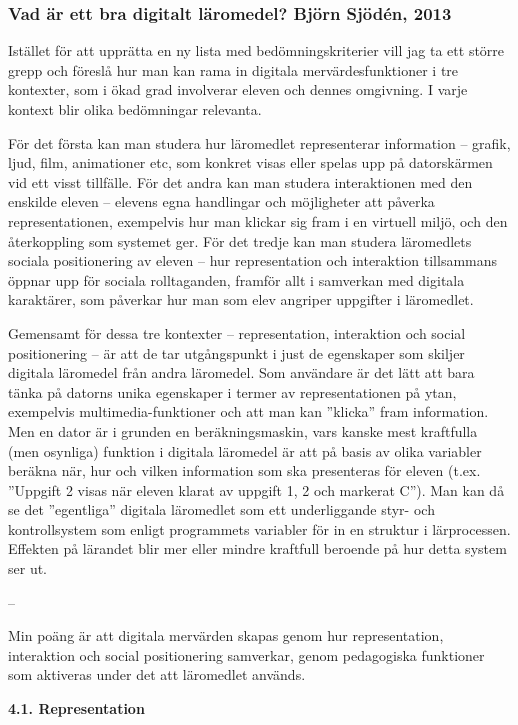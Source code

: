 \subsubsection{Vad är ett bra digitalt läromedel? Björn Sjödén, 2013}

Istället för att upprätta en ny lista med bedömningskriterier vill jag ta ett större grepp och föreslå hur man kan rama in digitala mervärdesfunktioner i tre kontexter, som i ökad grad involverar eleven och dennes omgivning. I varje kontext blir olika bedömningar relevanta.

För det första kan man studera hur läromedlet representerar information – grafik, ljud, film, animationer etc, som konkret visas eller spelas upp på datorskärmen vid ett visst tillfälle. För det andra kan man studera interaktionen med den enskilde eleven – elevens egna handlingar och möjligheter att påverka representationen, exempelvis hur man klickar sig fram i en virtuell miljö, och den återkoppling som systemet ger. För det tredje kan man studera läromedlets sociala positionering av eleven – hur representation och interaktion tillsammans öppnar upp för sociala rolltaganden, framför allt i samverkan med digitala karaktärer, som påverkar hur man som elev angriper uppgifter i läromedlet.

Gemensamt för dessa tre kontexter – representation, interaktion och social positionering – är att de tar utgångspunkt i just de egenskaper som skiljer digitala läromedel från andra läromedel. Som användare är det lätt att bara tänka på datorns unika egenskaper i termer av representationen på ytan, exempelvis multimedia-funktioner och att man kan ”klicka” fram information. Men en dator är i grunden en beräkningsmaskin, vars kanske mest kraftfulla (men osynliga) funktion i digitala läromedel är att på basis av olika variabler beräkna när, hur och vilken information som ska presenteras för eleven (t.ex. ”Uppgift 2 visas när eleven klarat av uppgift 1, 2 och markerat C”). Man kan då se det ”egentliga” digitala läromedlet som ett underliggande styr- och kontrollsystem som enligt programmets variabler för in en struktur i lärprocessen. Effekten på lärandet blir mer eller mindre kraftfull beroende på hur detta system ser ut.

--

Min poäng är att digitala mervärden skapas genom hur representation, interaktion och social positionering samverkar, genom pedagogiska funktioner som aktiveras under det att läromedlet används.

\textbf{4.1. Representation}

